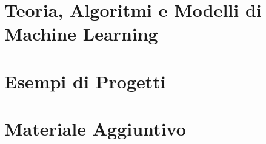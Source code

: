 \documentclass[a4paper,11pt]{book}
\numberwithin{equation}{chapter}
\begin{document}


\tableofcontents
\cleardoublepage

\mainmatter

\part{Teoria, Algoritmi e Modelli di Machine Learning}











\appendix
\part{Esempi di Progetti}


\part{Materiale Aggiuntivo}




\backmatter
\printbibliography
\end{document}
